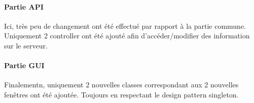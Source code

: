\paragraph{Partie API}
Ici, très peu de changement ont été effectué par rapport à la partie commune.
Uniquement 2 controller ont été ajouté afin d'accéder/modifier des information sur le serveur.

\paragraph{Partie GUI}
Finalementn, uniquement 2 nouvelles classes correspondant aux 2 nouvelles fenêtres ont été ajoutée. Toujours en respectant le design pattern singleton.